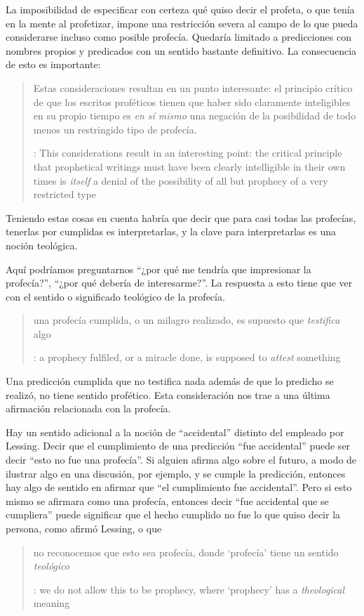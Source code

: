 La imposibilidad de especificar con certeza qué quiso decir el profeta, o que
tenía en la mente al profetizar, impone una restricción severa al campo de lo
que pueda considerarse incluso como posible profecía. Quedaría limitado a
predicciones con nombres propios y predicados con un sentido bastante
definitivo. La consecuencia de esto es importante:
\blockquote[{\cite[31]{anscombe2008faith:prophandmi}}: This considerations
result in an interesting point: the critical principle that prophetical writings
must have been clearly intelligible in their own times is \emph{itself} a denial
of the possibility of all but prophecy of a very restricted type]{Estas
  consideraciones resultan en un punto interesante: el principio crítico de que
  los escritos proféticos tienen que haber sido claramente inteligibles en su
  propio tiempo es \emph{en sí mismo} una negación de la posibilidad de todo
  menos un restringido tipo de profecía.}
Teniendo estas cosas en cuenta habría que decir que para casi todas las
profecías, tenerlas por cumplidas es interpretarlas, y la clave para
interpretarlas es una noción teológica.

Aquí podríamos preguntarnos \enquote{¿por qué me tendría que impresionar la
  profecía?}, \enquote{¿por qué debería de interesarme?}. La respuesta a esto
tiene que ver con el sentido o significado teológico de la profecía.
\blockquote[{\cite[32]{anscombe2008faith:prophandmi}}: a prophecy fulfiled, or a
miracle done, is supposed to \emph{attest} something]{una profecía cumplida, o
  un milagro realizado, es supuesto que \emph{testifica} algo}. Una predicción
cumplida que no testifica nada además de que lo predicho se realizó, no tiene
sentido profético. Esta consideración nos trae a una última afirmación
relacionada con la profecía.

Hay un sentido adicional a la noción de \enquote{accidental} distinto del
empleado por Lessing. Decir que el cumplimiento de una predicción \enquote{fue
  accidental} puede ser decir \enquote {esto no fue una profecía}. Si alguien
afirma algo sobre el futuro, a modo de ilustrar algo en una discusión, por
ejemplo, y se cumple la predicción, entonces hay algo de sentido en afirmar que
\enquote{el cumplimiento fue accidental}. Pero si esto mismo se afirmara como
una profecía, entonces decir \enquote{fue accidental que se cumpliera} puede
significar que el hecho cumplido no fue lo que quiso decir la persona, como
afirmó Lessing, o que \blockquote[{\cite[34]{anscombe2008faith:prophandmi}}: we
do not allow this to be prophecy, where `prophecy' has a \emph{theological}
meaning]{no reconocemos que esto sea profecía, donde `profecía' tiene un sentido
  \emph{teológico}}.





